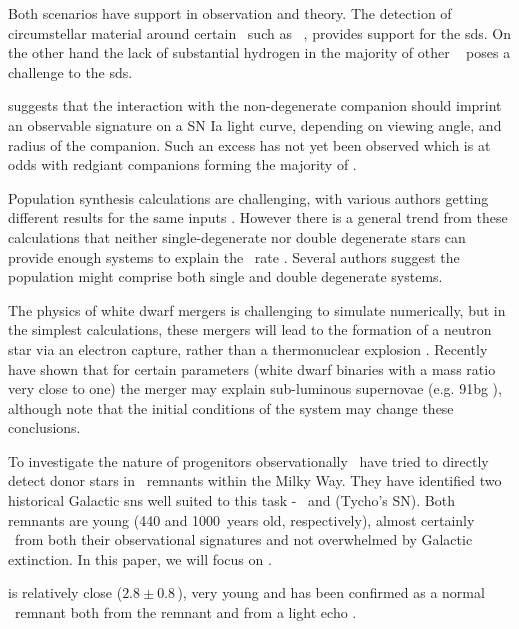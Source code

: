 Both scenarios have support in observation and theory. The detection of circumstellar material around certain \snia\, such as \ \citep{2007Sci...317..924P}, provides support for the \gls{sds}. On the other hand the lack of substantial hydrogen in the majority of other \sneia\ \citep{2007ApJ...670.1275L} poses a challenge to the \gls{sds}.


\citet{2010ApJ...708.1025K} suggests that the interaction with the non-degenerate companion should imprint an observable signature on a SN Ia  light curve, depending on viewing angle, and radius of the companion. Such an excess has not yet been observed \citep{2010ApJ...722.1691H, 2011Ap&SS.tmp...40T, 2011arXiv1106.4008B} which is at odds with \gls{redgiant} companions forming the majority of \sneia.

Population synthesis calculations are challenging, with various authors getting different results for the same inputs \citep[e.g.][]{Nelemans:2010fk}. However there is a general trend from these calculations that neither single-degenerate nor double degenerate stars can provide enough systems to explain the \snia\ rate \citep{2009ApJ...699.2026R, 2010A&A...515A..89M,2010A&A...521A..85Y,2008ApJ...677L.109H}. Several authors suggest the population might comprise both single and double degenerate systems.

The physics of white dwarf mergers is challenging to simulate numerically, but in the simplest calculations, these mergers will lead to the formation of a neutron star via an electron capture, rather than a thermonuclear explosion \citep{1985A&A...150L..21S}. Recently \citet{2010Natur.463...61P} have shown that for certain parameters (white dwarf binaries with a mass ratio very close to one) the merger may explain sub-luminous supernovae (e.g. \gls{91bg} \sneia), although \citet{2011arXiv1101.5132D} note that the initial conditions of the system may change these conclusions.

To investigate the nature of progenitors observationally \rl\ have tried to directly detect donor stars in \snia\ remnants within the Milky Way. They have identified two historical Galactic \glspl{sn} well suited to this task - \ and  (Tycho's SN). Both remnants are young (440 and 1000~years old, respectively), almost certainly \snia\ from both their observational signatures \citep{2006ApJ...645.1373B,2004ApJ...612..357R} and not overwhelmed by Galactic extinction. In this paper, we will focus on . 

 is relatively close ($2.8\pm0.8$\,\kpc), very young and has been confirmed as a normal \snia\ remnant both from the remnant \citep{2006ApJ...645.1373B} and from a light echo \citep{2008Natur.456..617K, 2008ApJ...681L..81R}.


